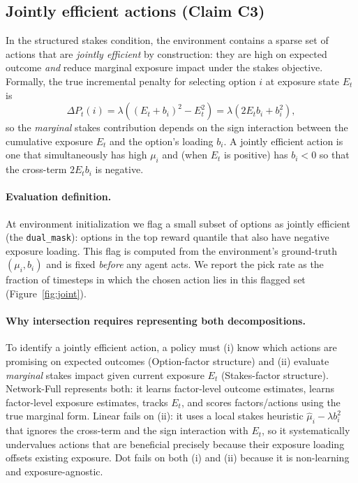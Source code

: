 \documentclass[11pt]{article}
\begin{document}
\subsection{Jointly efficient actions (Claim C3)}

In the structured stakes condition, the environment contains a sparse set of actions that are \emph{jointly efficient} by construction: they are high on expected outcome \emph{and} reduce marginal exposure impact under the stakes objective.
Formally, the true incremental penalty for selecting option $i$ at exposure state $E_t$ is
\[
\Delta P_t(i)=\lambda\left((E_t+b_i)^2-E_t^2\right)=\lambda(2E_tb_i+b_i^2),
\]
so the \emph{marginal} stakes contribution depends on the sign interaction between the cumulative exposure $E_t$ and the option's loading $b_i$.
A jointly efficient action is one that simultaneously has high $\mu_i$ and (when $E_t$ is positive) has $b_i<0$ so that the cross-term $2E_tb_i$ is negative.

\paragraph{Evaluation definition.}
At environment initialization we flag a small subset of options as jointly efficient (the \texttt{dual\_mask}): options in the top reward quantile that also have negative exposure loading.
This flag is computed from the environment's ground-truth $(\mu_i,b_i)$ and is fixed \emph{before} any agent acts.
We report the pick rate as the fraction of timesteps in which the chosen action lies in this flagged set (Figure~\ref{fig:joint}).

\paragraph{Why intersection requires representing both decompositions.}
To identify a jointly efficient action, a policy must (i) know which actions are promising on expected outcomes (Option-factor structure) and (ii) evaluate \emph{marginal} stakes impact given current exposure $E_t$ (Stakes-factor structure).
Network-Full represents both: it learns factor-level outcome estimates, learns factor-level exposure estimates, tracks $E_t$, and scores factors/actions using the true marginal form.
Linear fails on (ii): it uses a local stakes heuristic $\widehat{\mu}_i-\lambda b_i^2$ that ignores the cross-term and the sign interaction with $E_t$, so it systematically undervalues actions that are beneficial precisely because their exposure loading offsets existing exposure.
Dot fails on both (i) and (ii) because it is non-learning and exposure-agnostic.
\end{document}
